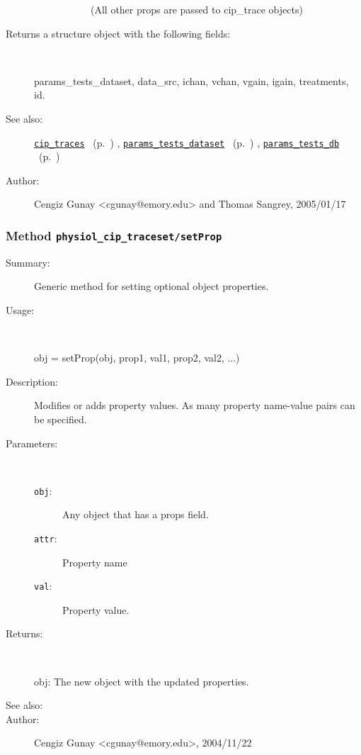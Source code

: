 \begin{description}
\begin{description}
\begin{description}
(All other props are passed to cip\_trace objects)\end{description}%
\end{description}%
%
\item[Returns a structure object with the following fields:]~

	params\_tests\_dataset,
	data\_src, ichan, vchan, vgain, igain, treatments, id.
%
%
\item[See also:]%
\hyperlink{ref_cip_traces}{\texttt{cip\_traces}}%
\ (p.~\pageref{ref_cip_traces})%
%
, \hyperlink{ref_params_tests_dataset}{\texttt{params\_tests\_dataset}}%
\ (p.~\pageref{ref_params_tests_dataset})%
%
, \hyperlink{ref_params_tests_db}{\texttt{params\_tests\_db}}%
\ (p.~\pageref{ref_params_tests_db})%
%
%
\item[Author:]%
Cengiz Gunay <cgunay@emory.edu> and Thomas Sangrey, 2005/01/17%
\end{description}
\methodline%
\subsubsection[Method \texttt{setProp}]{Method \texttt{physiol\_cip\_traceset/setProp}}%
%
\label{ref_physiol_cip_traceset__setProp}%
\hypertarget{ref_physiol_cip_traceset__setProp}{}%
\begin{description}
\item[Summary:]Generic method for setting optional object properties.
%
\item[Usage:]~%
\begin{lyxcode}%
obj = setProp(obj, prop1, val1, prop2, val2, ...)
%
\end{lyxcode}%
%
\item[Description:]%
Modifies or adds property values. As many property name-value 
 pairs can be specified.
\item[Parameters:]~
\begin{description}%
\item[\texttt{obj}:]
 Any object that has a props field.
\item[\texttt{attr}:]
 Property name
\item[\texttt{val}:]
 Property value.
\end{description}%
%
\item[Returns:]~

	obj: The new object with the updated properties.
%
%
\item[See also:]%
%
\item[Author:]%
Cengiz Gunay <cgunay@emory.edu>, 2004/11/22%
\end{description}
\methodline%
